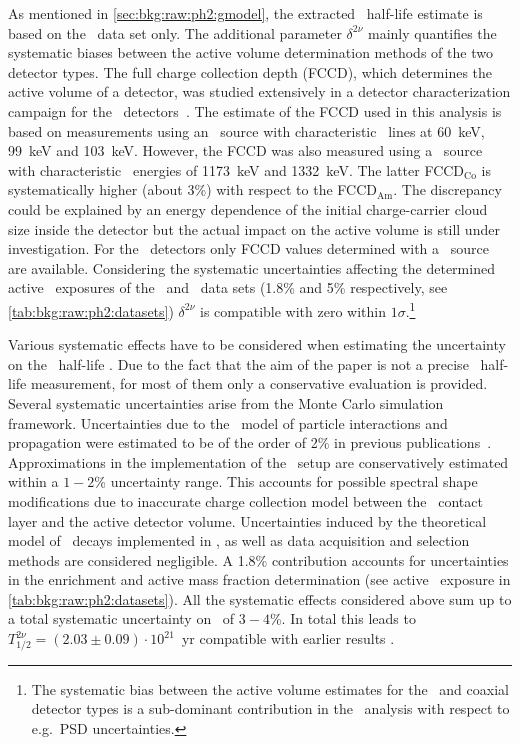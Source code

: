 As mentioned in \cref{sec:bkg:raw:ph2:gmodel}, the extracted \nnbb\ half-life estimate is
based on the \enrBEGeII\ data set only. The additional parameter $\delta^{2\nu}$ mainly
quantifies the systematic biases between the active volume determination methods of the
two detector types. The full charge collection depth (FCCD), which determines the active
volume of a detector, was studied extensively in a detector characterization campaign for
the \bege\ detectors~\cite{Agostini2015e, Agostini2019}. The estimate of the FCCD used in
this analysis is based on measurements using an \Am\ source with characteristic \g\ lines
at 60~keV, 99~keV and 103~keV.  However, the FCCD was also measured using a \Co\ source
with characteristic \g\ energies of 1173~keV and 1332~keV. The latter FCCD$_\text{Co}$ is
systematically higher (about 3\%) with respect to the FCCD$_\text{Am}$. The discrepancy
could be explained by an energy dependence of the initial charge-carrier cloud size inside
the detector but the actual impact on the active volume is still under investigation.  For
the \scoax\ detectors only FCCD values determined with a \Co\ source are available.
Considering the systematic uncertainties affecting the determined active \gesix\ exposures
of the \enrBEGeII\ and \enrCoaxII\ data sets (1.8\% and 5\% respectively, see
\cref{tab:bkg:raw:ph2:datasets}) $\delta^{2\nu}$ is compatible with zero within
$1\sigma$.\footnote{The systematic bias between the active volume estimates for the \bege\
and coaxial detector types is a sub-dominant contribution in the \onbb\ analysis with
respect to e.g.~PSD uncertainties.}

Various systematic effects have to be considered when estimating the uncertainty on the
\nnbb\ half-life \thalftwo. Due to the fact that the aim of the paper is not a precise
\nnbb\ half-life measurement, for most of them only a conservative evaluation is provided.
Several systematic uncertainties arise from the Monte Carlo simulation framework.
Uncertainties due to the \geant\ model of particle interactions and propagation were
estimated to be of the order of 2\% in previous publications~\cite{Agostini2013a,
Agostini2015a}. Approximations in the implementation of the \gerda\ setup are
conservatively estimated within a $1-2$\% uncertainty range. This accounts for possible
spectral shape modifications due to inaccurate charge collection model between the \nplus\
contact layer and the active detector volume. Uncertainties induced by the theoretical
model of \nnbb\ decays implemented in \decayzero, as well as data acquisition and
selection methods are considered negligible. A 1.8\% contribution accounts for
uncertainties in the enrichment and active mass fraction determination (see active \gesix\
exposure in \cref{tab:bkg:raw:ph2:datasets}). All the systematic effects considered above
sum up to a total systematic uncertainty on \thalftwo\ of $3-4$\%. In total this leads to
$T^{2\nu}_{1/2} = (2.03 \pm 0.09) \cdot 10^{21}$~yr compatible with earlier results
\cite{Agostini2013a, Agostini2015a}.

